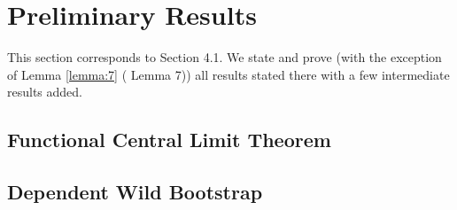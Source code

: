 \section{Preliminary Results}

This section corresponds to \cite{[0]BUCCHIA2017344} Section 4.1. We state and prove (with the exception of Lemma \ref{lemma:7} (\cite{[0]BUCCHIA2017344} Lemma 7)) all results stated there with a few intermediate results added.

\subsection{Functional Central Limit Theorem}






\subsection{Dependent Wild Bootstrap}




